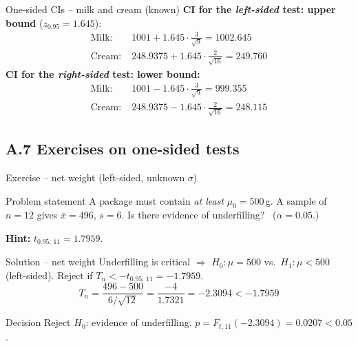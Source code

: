 \documentclass[aspectratio=169,11pt]{beamer}
\begin{document}
\begin{frame}{One-sided CIs -- milk and cream (known)}
  \textbf{CI for the \emph{left-sided} test: upper bound} ($z_{0.95}=1.645$):
  \begin{align*}
    \text{Milk:}\; & 1001 + 1.645\cdot\tfrac{3}{\sqrt{9}} = 1002.645\\
    \text{Cream:}\; & 248.9375 + 1.645\cdot\tfrac{2}{\sqrt{16}} = 249.760
  \end{align*}
  \textbf{CI for the \emph{right-sided} test: lower bound:}
  \begin{align*}
    \text{Milk:}\; & 1001 - 1.645\cdot\tfrac{3}{\sqrt{9}} = 999.355\\
    \text{Cream:}\; & 248.9375 - 1.645\cdot\tfrac{2}{\sqrt{16}} = 248.115
  \end{align*}
\end{frame}
\subsection{A.7 Exercises on one-sided tests}

\begin{frame}{Exercise -- net weight (left-sided, unknown $\sigma$)}
  \begin{block}{Problem statement}
    A package must contain \emph{at least} $\mu_0 = 500\,$g. A sample of
    $n=12$ gives $\bar x = 496$, $s = 6$. Is there evidence of underfilling?
    \ ($\alpha=0.05$.)
  \end{block}
  \textbf{Hint:} $t_{0.95;\,11} = 1.7959$.
\end{frame}

\begin{frame}{Solution -- net weight}
  Underfilling is critical $\Rightarrow$ $H_0:\mu= 500$ vs.\ $H_1:\mu<500$
  (left-sided). Reject if $T_n < -t_{0.95;\,11} = -1.7959$.
  \[
    T_n = \frac{496-500}{6/\sqrt{12}} = \frac{-4}{1.7321} = -2.3094 < -1.7959
  \]
  \begin{alertblock}{Decision}
    Reject $H_0$: evidence of underfilling.
    $p = F_{t,11}(-2.3094) = \mathbf{0.0207} < 0.05$.
  \end{alertblock}
\end{frame}
\end{document}
